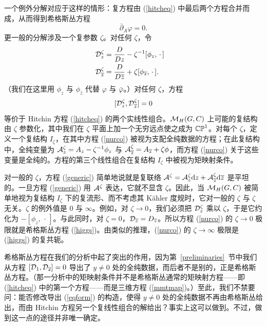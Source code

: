 一个例外分解对应于这样的情形：复方程由 (\ref{hitcheq}) 中最后两个方程合并而成，从而得到希格斯丛方程
\begin{equation}\label{higgs}\bar\partial_A\varphi=0.\end{equation}
更一般的分解涉及一个复参数 $\zeta$。对任何 $\zeta$，令
\begin{align}\label{generic} \D_z^\zeta& = \frac{D}{D z}-\zeta^{-1}[\phi_z,\,\cdot\,]\cr
                \D_{\bar z}^\zeta &=\frac{D}{D\bar z}+\zeta[\phi_{\bar z},\,\cdot\,].\end{align}
（我们在这里用 $\phi_z$ 与 $\phi_{\bar z}$ 代替 $\varphi$ 与 $\bar\varphi$。）对任何 $\zeta$，方程
\begin{equation}\label{nurco}[\D_z^\zeta,\D_{\bar z}^\zeta]=0 \end{equation}
等价于 Hitchin 方程 (\ref{hitcheq}) 的两个实线性组合。$\M_H(G,C)$ 上可能的复结构由 $\zeta$ 参数化，其中我们在 $\zeta$ 平面上加一个无穷远点使之成为 $\Bbb{CP}^1$。对每个 $\zeta$，定义一个复结构 $I_\zeta$，在其中方程 (\ref{nurco}) 被视为支配全纯数据的方程；在此复结构中，全纯变量为 $\A^\zeta_z=A_z-\zeta^{-1}\phi_z$ 与 $\A_{\bar z}^\zeta=A_{\bar z}+\zeta \phi$，而方程 (\ref{nurco}) 关于这些变量是全纯的。方程的第三个线性组合在复结构 $I_\zeta$ 中被视为矩映射条件。

对一般的 $\zeta$，方程 (\ref{generic}) 简单地说就是复联络 $\A^\zeta=\A_z^\zeta \d z+\A_{\bar z}^\zeta \d \bar z$ 是平坦的。一旦方程 (\ref{generic}) 用 $\A^\zeta$ 表达，它就不显含 $\zeta$。因此，当 $\M_H(G,C)$ 被简单地视为复结构 $I_\zeta$ 下的复流形、而不考虑其 Kähler 度规时，它对一般的 $\zeta$ 与 $\zeta$ 无关。$\zeta$ 的例外值是 0 与 $\infty$。例如，对 $\zeta\to 0$，我们必须把 $\D_z^\zeta$ 乘以 $\zeta$，于是它约化为 $-[\phi_z,\,\cdot\,]$。与此同时，对 $\zeta=0$，$\D_{\bar z}=D_{\bar z}$。所以方程 (\ref{nurco}) 的 $\zeta\to 0$ 极限就是希格斯丛方程 (\ref{higgs})。由类似的推理，(\ref{nurco}) 的 $\zeta\to\infty$ 极限是 (\ref{higgs}) 的复共轭。

希格斯丛方程在我们的分析中起了突出的作用，因为第~\ref{preliminaries}~节中我们从方程 $[\D_1,\D_2]=0$ 导出了 $y\not=0$ 处的全纯数据，而后者不是别的，正是希格斯丛方程。（那一分析中的矩映射条件并不是希格斯丛通常的矩映射方程——即 (\ref{hitcheq}) 中的第一个方程——而是三维方程 (\ref{mmtmap})。）至此，我们不禁要问：能否修改导出 (\ref{eqform}) 的构造，使得 $y\not=0$ 处的全纯数据不再由希格斯丛给出，而由 Hitchin 方程另一个复线性组合的解给出？事实上这可以做到。不过，做到这一点的途径并非唯一确定。

